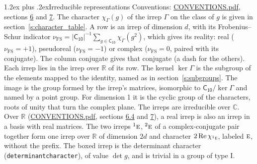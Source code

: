 \documentclass[10pt,a4paper]{article}
\makeatletter
\renewcommand\section{\@startsection{section}{1}{\z@}{-3ex plus -1ex minus -.2ex}%
  {1.2ex plus .2ex}{\normalfont\large\sffamily\bfseries\color{parttitle}}}
\numberwithin{equation}{section}
\newcommand{\grp}[1]{\mathsf{#1}}
\newcommand{\irr}[1]{\text{\normalfont\scshape #1}}
\newcommand{\conjpair}[1]{{}^{#1}}
\newcommand{\irchar}[1]{\chi_{#1}}
\newcommand{\fsind}{\nu_{\mathrm{FS}}}
\makeatother
\begin{document}
\section{Irreducible representations}\label{s:irreps}
Conventions: \href{../../CONVENTIONS.pdf}{CONVENTIONS.pdf}, sections \href{../../CONVENTIONS.pdf\#conv.6}{6} and \href{../../CONVENTIONS.pdf\#conv.7}{7}.
\leavevmode\label{n:function.character}\label{n:irrep.Gamma}The character $\irchar{\Gamma}(g)$ of the irrep $\Gamma$ on the class of $g$ is given in section~\ref{s:character_table}.
\leavevmode\label{n:index.dimension}\label{n:index.frobenius}\label{n:head.irrep}\label{n:head.reality}A row is an irrep of dimension $d$, with its Frobenius--Schur indicator $\fsind = |\grp{C_{10}}|^{-1}\allowbreak\sum_{g\in\grp{C_{10}}}\irchar{\Gamma}(g^2)$, which gives its reality: real ($\fsind = +1$), pseudoreal ($\fsind = -1$) or complex ($\fsind = 0$, paired with its conjugate). \label{n:head.conjugate}The column conjugate gives that conjugate (a dash for the others). \label{n:head.over.real}Each irrep lies in the irrep over $\mathbb{R}$ of its row. \label{n:head.kernel}The kernel $\ker\Gamma$ is the subgroup of the elements mapped to the identity, named as in section~\ref{s:subgroups}. \label{n:head.image}The image is the group formed by the irrep's matrices, isomorphic to $\grp{C_{10}}/\ker\Gamma$ and named by a point group. For dimension 1 it is the cyclic group of the characters, roots of unity that turn the complex plane. The irreps are irreducible over $\mathbb{C}$. Over $\mathbb{R}$ (\href{../../CONVENTIONS.pdf}{CONVENTIONS.pdf}, sections \href{../../CONVENTIONS.pdf\#conv.6.4}{6.4} and \href{../../CONVENTIONS.pdf\#conv.7}{7}), a real irrep is also an irrep in a basis with real matrices. The two irreps $\conjpair{1}\irr{e}$, $\conjpair{2}\irr{e}$ of a complex-conjugate pair together form one irrep over $\mathbb{R}$ of dimension $2d$ and character $2\operatorname{Re}\irchar{\conjpair{1}\irr{e}}$, labeled $\irr{e}$, without the prefix. \label{n:mark.determinant}The boxed irrep is the determinant character (\texttt{determinantcharacter}), of value $\det g$, and is trivial in a group of type I.
\setlength{\emergencystretch}{2em}\par\setlength{\emergencystretch}{0pt}
\end{document}
